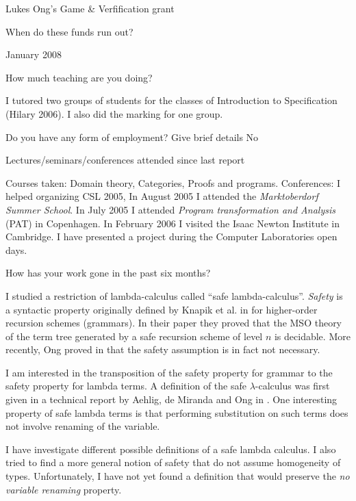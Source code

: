 \documentclass{article}
\def\answ#1{#1 \vspace{0.5em}}
\newcounter{SQcount}
\newenvironment{subq}{
\begin{list}
    {} %
    {   \usecounter{SQcount}
        \renewcommand{\makelabel}[1]{\stepcounter{SQcount} \textbf{\alph{SQcount}) \parbox[t]{0.8\linewidth}{{##1}}}  }
        \setlength{\rightmargin}{\leftmargin}
    }
}
{\end{list}}
\begin{document}
\begin{list}
\begin{subq}
    \answ{Lukes Ong's Game \& Verfification grant }

\item[When do these funds run out?] \

   \answ{January 2008}

\end{subq}

\item[How much teaching are you doing?] \

\answ{I tutored two groups of students for the classes of Introduction to Specification (Hilary 2006). I also did the marking for one group.}

\item[Do you have any form of employment? Give brief details]
\answ{No}

\item[Lectures/seminars/conferences attended since last report] \

\answ{Courses taken: Domain theory, Categories, Proofs and programs. Conferences: I helped organizing CSL 2005,
In August 2005 I attended the \emph{Marktoberdorf Summer School}. In July 2005 I attended \emph{Program transformation and Analysis} (PAT) in Copenhagen.
In February 2006 I visited the Isaac Newton Institute in Cambridge. I have presented a project during the Computer Laboratories open days.
}

\item[How has your work gone in the past six months?] \

\answ{ I studied a restriction of lambda-calculus called ``safe
lambda-calculus''. \emph{Safety} is a syntactic property originally
defined by Knapik et al. in \cite{KNU02} for higher-order recursion
schemes (grammars). In their paper they proved that the MSO theory
of the term tree generated by a safe recursion scheme of level $n$
is decidable. More recently, Ong proved in \cite{OngLics2006} that
the safety assumption is in fact not necessary.}

I am interested in the transposition of the safety property for
grammar to the safety property for lambda terms. A definition of the
safe $\lambda$-calculus was first given in a technical report by
Aehlig, de Miranda and Ong in \cite{safety-mirlong2004}. One
interesting property of safe lambda terms is that performing
substitution on such terms does not involve renaming of the
variable.

I have investigate different possible definitions of a safe lambda
calculus. I also tried to find a more general notion of safety that
do not assume homogeneity of types. Unfortunately, I have not yet
found a definition that would preserve the \emph{no variable
renaming} property.


\end{list}
\end{document}
